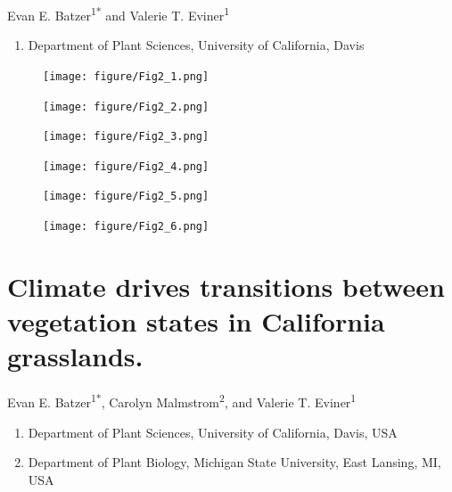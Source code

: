 \documentclass[twoside,12pt,final]{ucthesis-CA2012}
\providecommand{\tightlist}{%
  \setlength{\itemsep}{0pt}\setlength{\parskip}{0pt}}
\begin{document}
\begin{ucmainmatter}

Evan E. Batzer\textsuperscript{1*} and Valerie T. Eviner\textsuperscript{1}
\begin{enumerate}
\def\labelenumi{\arabic{enumi}.}
\tightlist
\item
  Department of Plant Sciences, University of California, Davis
\end{enumerate}
\begin{figure}
\centering
\texttt{[image: figure/Fig2\_1.png]}
\caption{\label{fig-2-1}}
\end{figure}
\begin{figure}
\centering
\texttt{[image: figure/Fig2\_2.png]}
\caption{\label{fig-2-2}}
\end{figure}
\begin{figure}
\centering
\texttt{[image: figure/Fig2\_3.png]}
\caption{\label{fig-2-3}}
\end{figure}
\begin{figure}
\centering
\texttt{[image: figure/Fig2\_4.png]}
\caption{\label{fig-2-4}}
\end{figure}
\begin{figure}
\centering
\texttt{[image: figure/Fig2\_5.png]}
\caption{\label{fig-2-5}}
\end{figure}
\begin{figure}
\centering
\texttt{[image: figure/Fig2\_6.png]}
\caption{\label{fig-2-6}}
\end{figure}
\hypertarget{climate-drives-transitions-between-vegetation-states-in-california-grasslands.}{%
\chapter{Climate drives transitions between vegetation states in California grasslands.}\label{climate-drives-transitions-between-vegetation-states-in-california-grasslands.}}


Evan E. Batzer\textsuperscript{1*},
Carolyn Malmstrom\textsuperscript{2},
and Valerie T. Eviner\textsuperscript{1}
\begin{enumerate}
\def\labelenumi{\arabic{enumi}.}
\tightlist
\item
  Department of Plant Sciences, University of California, Davis, USA
\item
  Department of Plant Biology, Michigan State University, East Lansing, MI, USA
\end{enumerate}
\hypertarget{abstract}{%
}
\end{ucmainmatter}
\end{document}
